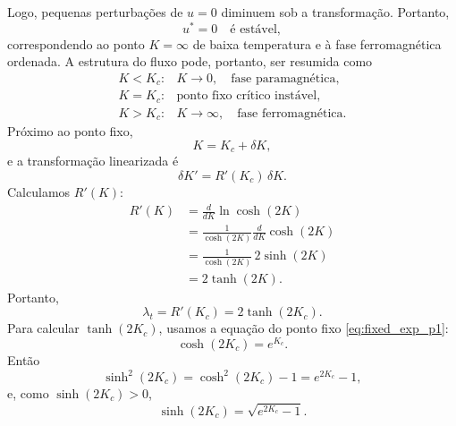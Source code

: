 \documentclass[12pt,a4paper]{article}
\begin{document}
%
Logo, pequenas perturbações de $u=0$ diminuem sob a transformação.
Portanto,
%
\begin{equation}
    u^*=0\quad\text{é estável},
\end{equation}
%
correspondendo ao ponto $K=\infty$ de baixa temperatura e à fase
ferromagnética ordenada. A estrutura do fluxo pode, portanto, ser resumida como
%
\begin{equation}
    \begin{array}{ll}
    K<K_c: & K\longrightarrow0,
    \quad\text{fase paramagnética},\\[4pt]
    K=K_c: & \text{ponto fixo crítico instável},\\[4pt]
    K>K_c: & K\longrightarrow\infty,
    \quad\text{fase ferromagnética}.
    \end{array}
\end{equation}
%
Próximo ao ponto fixo,
%
\begin{equation}
    K=K_c+\delta K,
\end{equation}
%
e a transformação linearizada é
%
\begin{equation}
    \delta K'
    =
    R'(K_c)\,\delta K.
    \label{eq:linearized_p1}
\end{equation}
%
Calculamos \(R'(K)\):
%
\begin{align}
    R'(K)
    &=
    \frac{d}{dK}
    \ln\cosh(2K)
    \nonumber\\[4pt]
    &=
    \frac{1}{\cosh(2K)}
    \frac{d}{dK}
    \cosh(2K)
    \nonumber\\[4pt]
    &=
    \frac{1}{\cosh(2K)}
    \,
    2\sinh(2K)
    \nonumber\\[4pt]
    &=
    2\tanh(2K).
    \label{eq:Rprime_p1}
\end{align}
%
Portanto,
%
\begin{equation}
    \lambda_t
    =
    R'(K_c)
    =
    2\tanh(2K_c).
    \label{eq:lambdat_form_p1}
\end{equation}
%
Para calcular \(\tanh(2K_c)\), usamos a equação do ponto fixo
\eqref{eq:fixed_exp_p1}:
%
\begin{equation}
    \cosh(2K_c)=e^{K_c}.
\end{equation}
%
Então
%
\begin{equation}
    \sinh^2(2K_c)
    =
    \cosh^2(2K_c)-1
    =
    e^{2K_c}-1,
\end{equation}
%
e, como \(\sinh(2K_c)>0\),
%
\begin{equation}
    \sinh(2K_c)
    =
    \sqrt{e^{2K_c}-1}.
\end{equation}
\end{document}
